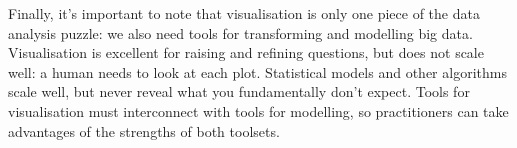 \documentclass[journal]{vgtc}                %
\begin{document}
Finally, it's important to note that visualisation is only one piece of the data analysis puzzle: we also need tools for transforming and modelling big data. Visualisation is excellent for raising and refining questions, but does not scale well: a human needs to look at each plot. Statistical models and other algorithms scale well, but never reveal what you fundamentally don't expect. Tools for visualisation must interconnect with tools for modelling, so practitioners can take advantages of the strengths of both toolsets.





\end{document}
